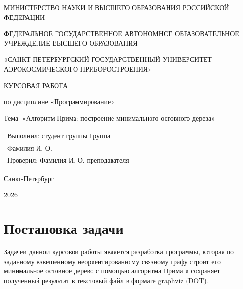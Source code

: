 \documentclass[a4paper,14pt]{extarticle}
\newcommand{\StudentName}{Фамилия И. О.}
\newcommand{\StudentGroup}{Группа}
\newcommand{\TeacherName}{Фамилия И. О. преподавателя}
\newcommand{\CourseYear}{2026}
\begin{document}
\begin{titlepage}
  \centering
  {\small МИНИСТЕРСТВО НАУКИ И ВЫСШЕГО ОБРАЗОВАНИЯ РОССИЙСКОЙ ФЕДЕРАЦИИ\par}
  \vspace{0.4cm}
  {\small ФЕДЕРАЛЬНОЕ ГОСУДАРСТВЕННОЕ АВТОНОМНОЕ ОБРАЗОВАТЕЛЬНОЕ УЧРЕЖДЕНИЕ ВЫСШЕГО ОБРАЗОВАНИЯ\par}
  \vspace{0.4cm}
  {\small «САНКТ-ПЕТЕРБУРГСКИЙ ГОСУДАРСТВЕННЫЙ УНИВЕРСИТЕТ АЭРОКОСМИЧЕСКОГО ПРИБОРОСТРОЕНИЯ»\par}

  \vspace{3cm}
  {\large КУРСОВАЯ РАБОТА\par}
  \vspace{0.6cm}
  {\large по дисциплине «Программирование»\par}
  \vspace{0.8cm}
  {\Large Тема: «Алгоритм Прима: построение минимального остовного дерева»\par}

  \vfill
  \begin{flushright}
    \begin{tabular}{l}
      Выполнил: студент группы \StudentGroup \\[0.2cm]
      \StudentName \\[0.6cm]
      Проверил: \TeacherName \\
    \end{tabular}
  \end{flushright}

  \vspace{1.5cm}
  {\small Санкт-Петербург\par}
  {\small \CourseYear\par}
\end{titlepage}

\tableofcontents
\newpage

\section{Постановка задачи}

Задачей данной курсовой работы является разработка программы, которая по
заданному взвешенному неориентированному связному графу строит его
минимальное остовное дерево с помощью алгоритма Прима и сохраняет полученный
результат в текстовый файл в формате graphviz (DOT).
\end{document}
